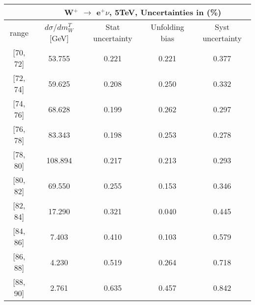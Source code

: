 \documentclass[12pt]{article}
\begin{document}
 
\begin{table}[] 
\begin{tabular}{c|c|c|c|c|}
\cline{2-5}
& \multicolumn{4}{c|}{W$^{+}$ $\rightarrow$ e$^{+} \nu $, 5TeV, Uncertainties in (\%)}  \\ \hline \hline 
\multicolumn{1}{|c|}{  range } & $d\sigma$/$dm^{T}_{W}$ [GeV]     & Stat uncertainty     & Unfolding bias     & Syst uncertainty        \\ \hline \hline 
\multicolumn{1}{|c|}{{[}70,  72{]}}  & 53.755 & 0.221 & 0.221 & 0.377 \\ \hline 
\multicolumn{1}{|c|}{{[}72,  74{]}}  & 59.625 & 0.208 & 0.250 & 0.332 \\ \hline 
\multicolumn{1}{|c|}{{[}74,  76{]}}  & 68.628 & 0.199 & 0.262 & 0.297 \\ \hline 
\multicolumn{1}{|c|}{{[}76,  78{]}}  & 83.343 & 0.198 & 0.253 & 0.278 \\ \hline 
\multicolumn{1}{|c|}{{[}78,  80{]}}  & 108.894 & 0.217 & 0.213 & 0.293 \\ \hline 
\multicolumn{1}{|c|}{{[}80,  82{]}}  & 69.550 & 0.255 & 0.153 & 0.346 \\ \hline 
\multicolumn{1}{|c|}{{[}82,  84{]}}  & 17.290 & 0.321 & 0.040 & 0.445 \\ \hline 
\multicolumn{1}{|c|}{{[}84,  86{]}}  & 7.403 & 0.410 & 0.103 & 0.579 \\ \hline 
\multicolumn{1}{|c|}{{[}86,  88{]}}  & 4.230 & 0.519 & 0.264 & 0.718 \\ \hline 
\multicolumn{1}{|c|}{{[}88,  90{]}}  & 2.761 & 0.635 & 0.457 & 0.842 \\ \hline 
\end{tabular}
\end{table}
\end{document}
